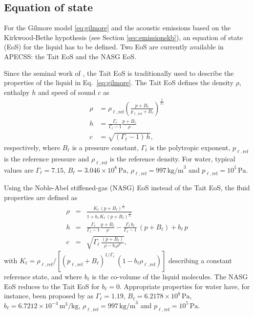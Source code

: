 \subsection{Equation of state}

For the Gilmore model \eqref{eq:gilmore} and the acoustic emissions based on the Kirkwood-Bethe hypothesis (see Section \ref{sec:emissionskb}), an equation of state (EoS) for the liquid has to be defined. Two EoS are currently available in APECSS: the Tait EoS and the NASG EoS. 

Since the seminal work of \citet{Gilmore1952}, the Tait EoS is traditionally used to describe the properties of the liquid in Eq.~\eqref{eq:gilmore}. The Tait EoS defines the density $\rho$, enthalpy $h$ and speed of sound $c$ as
\begin{align}
    \rho &= \rho_{\ell,\text{ref}} \left( \frac{p+B_\ell}{p_{\ell,\text{ref}}+B_\ell}\right)^{\frac{1}{\Gamma_\ell}} \label{eq:rho_Tait} \\
    h &= \frac{\Gamma_\ell}{\Gamma_\ell-1} \frac{p+B_\ell}{\rho} \label{eq:h_Tait} \\
    c &= \sqrt{(\Gamma_\ell -1) \, h}, \label{eq:c_Tait}
\end{align}
respectively, where $B_\ell$ is a pressure constant, $\Gamma_\ell$ is the polytropic exponent, $p_{\ell,\text{ref}}$ is the reference pressure and $\rho_{\ell,\text{ref}}$ is the reference density. For water, typical values are $\Gamma_\ell=7.15$, $B_\ell=3.046 \times 10^8 \, \text{Pa}$, $\rho_{\ell,\text{ref}} = 997 \, \mathrm{kg/m}^3$ and $p_{\ell,\text{ref}} = 10^5 \, \mathrm{Pa}$. 

Using the Noble-Abel stiffened-gas (NASG) EoS \citep{LeMetayer2016} instead of the Tait EoS, the fluid properties are defined as \citep{Denner2021}
 \begin{eqnarray}
    \rho &=& \frac{K_\ell \, (p+B_\ell)^{\frac{1}{\Gamma_\ell}}}{1+b_\ell \, K_\ell \,  (p+B_\ell)^{\frac{1}{\Gamma_\ell}}} \label{eq:rho_NASG}\\
      h &=& \frac{\Gamma_\ell}{\Gamma_\ell-1} \frac{p+B_\ell}{\rho} - \frac{\Gamma_\ell \, b_\ell}{\Gamma_\ell-1} \, (p+B_\ell) + b_\ell \, p \label{eq:h_NASG} \\
      c &=&\sqrt{\Gamma_\ell \, \frac{(p+B_\ell)}{\rho-b_\ell  \rho^2}},\label{eq:c_NASG}
    \end{eqnarray}
with $K_\ell = \rho_{\ell,\text{ref}}/[(p_{\ell,\text{ref}}+B_\ell)^{{1/\Gamma_\ell}} \ (1-b_\ell \rho_{\ell,\text{ref}})]$ describing a constant reference state, and where $b_\ell$ is the co-volume of the liquid molecules. The NASG EoS reduces to the Tait EoS for $b_\ell=0$. Appropriate properties for water have, for instance, been proposed by \citet{Chandran2019} as $\Gamma_\ell = 1.19$, $B_\ell = 6.2178 \times 10^{8} \, \mathrm{Pa}$, $b_\ell = 6.7212 \times 10^{-4} \, \mathrm{m}^3/\mathrm{kg}$, $\rho_{\ell,\text{ref}} = 997 \, \mathrm{kg/m}^3$ and $p_{\ell,\text{ref}} = 10^5 \, \mathrm{Pa}$.

